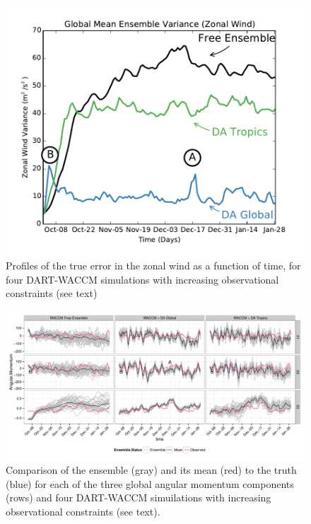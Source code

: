  \begin{figure}
	 \includegraphics[width=\textwidth]{Paper_figures/ERPDA_paper_evalvariable_state_space.pdf}
	 \caption{Profiles of the \textcolor{unsure}{true error} in the zonal wind as a function of time, for four DART-WACCM simulations with increasing observational constraints (see text)}
	 \label{fig:evalvariable_state}
\end{figure}



\begin{figure}
	 \includegraphics[width=\textwidth]{Paper_figures/ERPDA_paper_evalvariable_aam_space.pdf}
	 \caption{Comparison of the ensemble (gray) and its mean (red) to the truth (blue) for each of the three global angular momentum components (rows) and four DART-WACCM simuilations with increasing observational constraints (see text).}
	 \label{fig:evalvariable_aam}
\end{figure}





